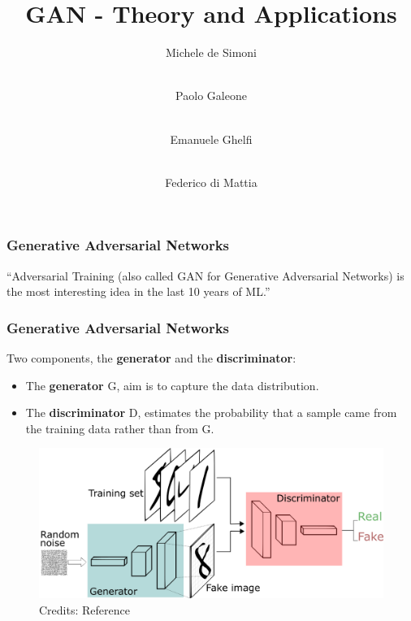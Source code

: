 \documentclass{beamer}
\title[GAN] %
{GAN - Theory and Applications}
\author %
{Michele de Simoni  \and  \\ Paolo Galeone \and \\ Emanuele Ghelfi \and \\ Federico di Mattia}
\begin{document}
 
{
  \begin{frame}
    \titlepage
  \end{frame}
}

 
\begin{frame}
\frametitle{Generative Adversarial Networks}

\begin{block}{}
	{\large ``Adversarial Training (also called GAN for Generative Adversarial Networks) is the most interesting idea in the last 10 years of ML.''}
	\vskip5mm
	\hspace*{}
\end{block}

\end{frame}

\begin{frame}
\frametitle{Generative Adversarial Networks}
	Two components, the \textbf{generator} and the \textbf{discriminator}:
	\begin{itemize}
		\item The \textbf{generator} G, aim is to capture the data distribution.
		\item The \textbf{discriminator} D, estimates the probability that a sample came from the training data rather than from G.
	\end{itemize}

\begin{figure}
	\includegraphics[width=\textwidth]{GANs.png}
	\caption{Credits: Reference  }
\end{figure}

\end{frame}
\end{document}
